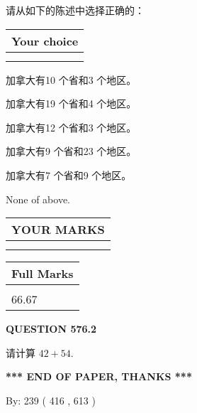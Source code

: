 \documentclass{ctexart}
\begin{document}
  
请从如下的陈述中选择正确的：
  
  
\noindent\hspace{3.0in} \begin{tabular}{|l|}
\hline
Your choice \\
\hline
 \\ 
 \\ 
\hline
\end{tabular}
  
  
 
 
加拿大有10 个省和3 个地区。
 
 
加拿大有19 个省和4 个地区。
 
 
加拿大有12 个省和3 个地区。
 
 
加拿大有9 个省和23 个地区。
 
 
加拿大有7 个省和9 个地区。
 
 
 None of above.
 
 
  
\vspace{0.2in}
  
\noindent\begin{tabular}{|l|}
\hline
 YOUR MARKS  \\
\hline
 \\ 
 \\ 
\hline
\end{tabular}
\hspace{0.05in} \begin{tabular}{|l|}
\hline
 Full Marks  \\
\hline
 \\ 
66.67 \\
\hline
\end{tabular}
{\textbf{\Large{QUESTION
576.2 
}}}
  
  
 
请计算 $ %
42 +  %
54 $.
 

 

 
   
   
 \vspace{0.2in}
 
   
   
   
   
\vspace{1.0in} 
{\textbf{\large{ *** END OF PAPER, THANKS *** }}} 
   
   
\hspace{1.0in} By: 
 239 ( 416 ,  613 )
   
\end{document}
